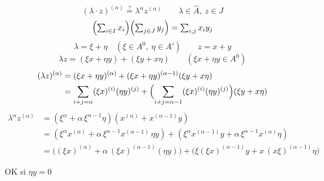 \documentclass[11pt,a4paper]{article}
\begin{document}
\[
  (\lambda\cdot z)^{(\alpha)} \overset{?}{=} \lambda^{\alpha} z^{(\alpha)}
  \qquad \lambda \in \hat{A},\ z \in J
\]
\[
  \textstyle\Bigl(\sum_{i \in I} x_i\Bigr)\Bigl(\sum_{j \in J} y_j\Bigr) = \sum_{i,j} x_i y_j
\]
\[
  \lambda = \xi + \eta \quad (\xi \in A^0,\ \eta \in A') \qquad z = x + y
\]
\[
  \lambda z = (\xi x + \eta y) + (\xi y + x\eta) \qquad (\xi x + \eta y \in A^0)
\]
\begin{align*}
  (\lambda z)^{(\alpha)} &= (\xi x + \eta y)^{(\alpha)} + (\xi x + \eta y)^{(\alpha-1)}(\xi y + x\eta) \\
  &= \sum_{i+j=\alpha} (\xi x)^{(i)} (\eta y)^{(j)}
     + \Bigl(\sum_{i+j=\alpha-1} (\xi x)^{(i)} (\eta y)^{(j)}\Bigr)(\xi y + x\eta)
\end{align*}
\begin{align*}
  \lambda^{\alpha} z^{(\alpha)} &= (\xi^{\alpha} + \alpha\,\xi^{\alpha-1}\eta)(x^{(\alpha)} + x^{(\alpha-1)} y) \\
  &= (\xi^{\alpha} x^{(\alpha)} + \alpha\,\xi^{\alpha-1} x^{(\alpha-1)}\,\eta y)
     + (\xi^{\alpha} x^{(\alpha-1)} y + \alpha\,\xi^{\alpha-1} x^{(\alpha)} \eta) \\
  &= \bigl((\xi x)^{(\alpha)} + \alpha\,(\xi x)^{(\alpha-1)}(\eta y)\bigr)
     + \bigl(\xi (\xi x)^{(\alpha-1)} y + x\,(x\xi)^{(\alpha-1)} \eta\bigr)
\end{align*}

OK si $\eta y = 0$
\end{document}
